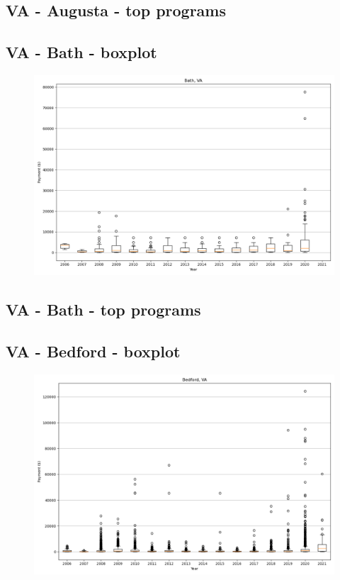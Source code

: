 \subsection*{VA - Augusta - top programs}

\newpage
\subsection*{VA - Bath - boxplot}
\begin{figure}[h]
\centering
\includegraphics[width=7in]{../output/boxplots/counties/Bath-VA_boxplot.png}
\end{figure}


\subsection*{VA - Bath - top programs}

\newpage
\subsection*{VA - Bedford - boxplot}
\begin{figure}[h]
\centering
\includegraphics[width=7in]{../output/boxplots/counties/Bedford-VA_boxplot.png}
\end{figure}


